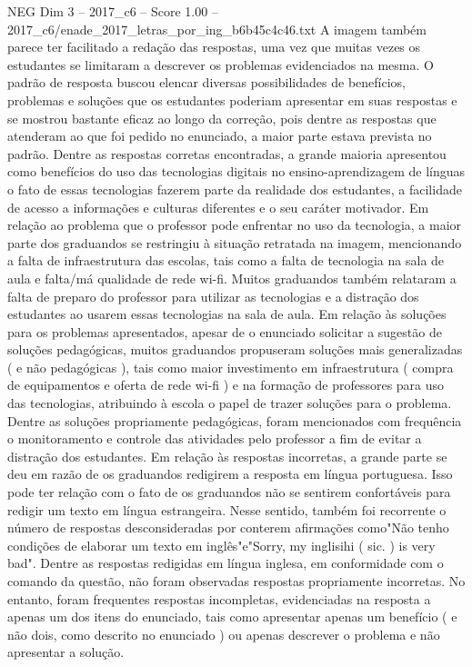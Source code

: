 \begin{textsample}{NEG Dim 3 – 2017\_c6 – Score 1.00 – 2017\_c6/enade\_2017\_letras\_por\_ing\_b6b45c4c46.txt}
A imagem também parece ter facilitado a redação das respostas, uma vez que muitas vezes os estudantes se limitaram a descrever os problemas evidenciados na mesma.
O padrão de resposta buscou elencar diversas possibilidades de benefícios, problemas e soluções que os estudantes poderiam apresentar em suas respostas e se mostrou bastante eficaz ao longo da correção, pois dentre as respostas que atenderam ao que foi pedido no enunciado, a maior parte estava prevista no padrão.
Dentre as respostas corretas encontradas, a grande maioria apresentou como benefícios do uso das tecnologias digitais no ensino-aprendizagem de línguas o fato de essas tecnologias fazerem parte da realidade dos estudantes, a facilidade de acesso a informações e culturas diferentes e o seu caráter motivador.
Em relação ao problema que o professor pode enfrentar no uso da tecnologia, a maior parte dos graduandos se restringiu à situação retratada na imagem, mencionando a falta de infraestrutura das escolas, tais como a falta de tecnologia na sala de aula e falta/má qualidade de rede wi-fi.
Muitos graduandos também relataram a falta de preparo do professor para utilizar as tecnologias e a distração dos estudantes ao usarem essas tecnologias na sala de aula.
Em relação às soluções para os problemas apresentados, apesar de o enunciado solicitar a sugestão de soluções pedagógicas, muitos graduandos propuseram soluções mais generalizadas ( e não pedagógicas ), tais como maior investimento em infraestrutura ( compra de equipamentos e oferta de rede wi-fi ) e na formação de professores para uso das tecnologias, atribuindo à escola o papel de trazer soluções para o problema.
Dentre as soluções propriamente pedagógicas, foram mencionados com frequência o monitoramento e controle das atividades pelo professor a fim de evitar a distração dos estudantes.
Em relação às respostas incorretas, a grande parte se deu em razão de os graduandos redigirem a resposta em língua portuguesa.
Isso pode ter relação com o fato de os graduandos não se sentirem confortáveis para redigir um texto em língua estrangeira.
Nesse sentido, também foi recorrente o número de respostas desconsideradas por conterem afirmações como"Não tenho condições de elaborar um texto em inglês"e"Sorry, my inglisihi ( sic. ) is very bad".
Dentre as respostas redigidas em língua inglesa, em conformidade com o comando da questão, não foram observadas respostas propriamente incorretas.
No entanto, foram frequentes respostas incompletas, evidenciadas na resposta a apenas um dos itens do enunciado, tais como apresentar apenas um benefício ( e não dois, como descrito no enunciado ) ou apenas descrever o problema e não apresentar a solução.

\end{textsample}
